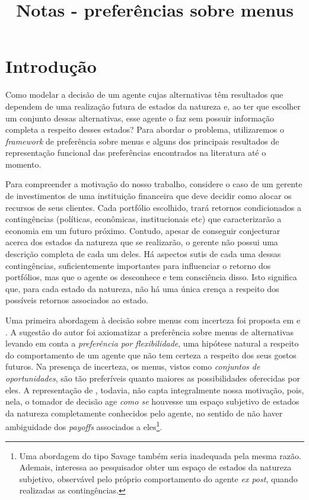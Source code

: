 \documentclass[11pt, a4paper]{article}
\title{Notas - preferências sobre menus}
\author{}
\theoremstyle{nonumberplain}
\theoremstyle{plain}
\theoremstyle{plain}
\theoremstyle{plain}
\begin{document}
\maketitle 

\tableofcontents

\section{Introdução}

Como modelar a decisão de um agente cujas alternativas têm resultados que dependem de uma realização futura de estados da natureza e, ao ter que escolher um conjunto dessas alternativas, esse agente o faz sem possuir informação completa a respeito desses estados? Para abordar o problema, utilizaremos o \emph{framework} de preferência sobre menus e alguns dos principais resultados de representação funcional das preferências encontrados na literatura até o momento.

Para compreender a motivação do nosso trabalho, considere o caso de um gerente de investimentos de uma instituição financeira que deve decidir como alocar os recursos de seus clientes. Cada portfólio escolhido, trará retornos condicionados a contingências (políticas, econômicas, institucionais etc) que caracterizarão a economia em um futuro próximo. Contudo, apesar de conseguir conjecturar acerca dos estados da natureza que se realizarão, o gerente não possui uma descrição completa de cada um deles. Há aspectos sutis de cada uma dessas contingências, suficientemente importantes para influenciar o retorno dos portfólios, mas que o agente os desconhece e tem consciência disso. Isto significa que, para cada estado da natureza, não há uma única crença a respeito dos possíveis retornos associados ao estado. 

Uma primeira abordagem à decisão sobre menus com incerteza foi proposta em \cite{Kreps1979} e \cite{Kreps1992}. A sugestão do autor foi axiomatizar a preferência sobre menus de alternativas levando em conta a \emph{preferência por flexibilidade}, uma hipótese natural a respeito do comportamento de um agente que não tem certeza a respeito dos seus gostos futuros. Na presença de incerteza, os menus, vistos como \emph{conjuntos de oportunidades}, são tão preferíveis quanto maiores as possibilidades oferecidas por eles. A representação de \cite{Kreps1979}, todavia, não capta integralmente nossa motivação, pois, nela, o tomador de decisão age \emph{como se} houvesse um espaço subjetivo de estados da natureza completamente conhecidos pelo agente, no sentido de não haver ambiguidade dos \emph{payoffs} associados a eles\footnote{Uma abordagem do tipo Savage também seria inadequada pela mesma razão. Ademais, interessa ao pesquisador obter um espaço de estados da natureza subjetivo, observável pelo próprio comportamento do agente \emph{ex post}, quando realizadas as contingências.}.
\end{document}
